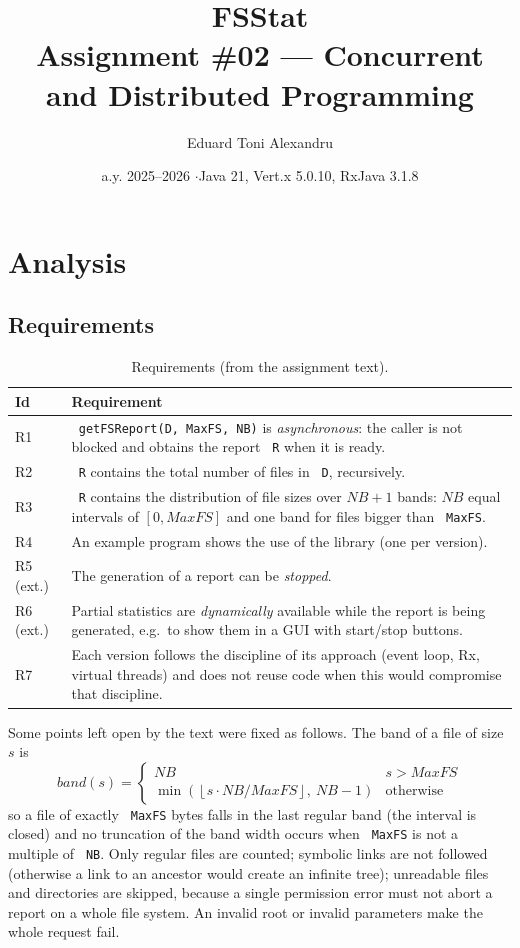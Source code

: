 \documentclass[11pt,a4paper]{article}
\title{\textbf{FSStat} \\[2pt] \large Assignment \#02 --- Concurrent and Distributed Programming}
\author{Eduard Toni Alexandru}
\date{a.y. 2025--2026 \quad$\cdot$\quad Java 21, Vert.x 5.0.10, RxJava 3.1.8}
\newcommand{\code}[1]{\texttt{\hyphenchar\font=-1 #1}}
\begin{document}
\maketitle

\section{Analysis}

\subsection{Requirements}

\begin{table}[h]
\centering\small
\begin{tabularx}{\textwidth}{@{}lY@{}}
\toprule
\textbf{Id} & \textbf{Requirement} \\
\midrule
R1 & \code{getFSReport(D, MaxFS, NB)} is \emph{asynchronous}: the caller is not blocked and obtains the
     report \code{R} when it is ready. \\
R2 & \code{R} contains the total number of files in \code{D}, recursively. \\
R3 & \code{R} contains the distribution of file sizes over $NB+1$ bands: $NB$ equal intervals of
     $[0, MaxFS]$ and one band for files bigger than \code{MaxFS}. \\
R4 & An example program shows the use of the library (one per version). \\
R5 (ext.) & The generation of a report can be \emph{stopped}. \\
R6 (ext.) & Partial statistics are \emph{dynamically} available while the report is being generated,
     e.g.\ to show them in a GUI with start/stop buttons. \\
R7 & Each version follows the discipline of its approach (event loop, Rx, virtual threads) and does not
     reuse code when this would compromise that discipline. \\
\bottomrule
\end{tabularx}
\caption{Requirements (from the assignment text).}\label{tab:req}
\end{table}

Some points left open by the text were fixed as follows. The band of a file of size $s$ is
\[
  band(s) = \begin{cases} NB & s > MaxFS\\ \min\left(\left\lfloor s\cdot NB / MaxFS \right\rfloor,\ NB-1\right) & \text{otherwise}\end{cases}
\]
so a file of exactly \code{MaxFS} bytes falls in the last regular band (the interval is closed) and no
truncation of the band width occurs when \code{MaxFS} is not a multiple of \code{NB}. Only regular files
are counted; symbolic links are not followed (otherwise a link to an ancestor would create an infinite
tree); unreadable files and directories are skipped, because a single permission error must not
abort a report on a whole file system. An invalid root or invalid parameters make the whole
request fail.
\end{document}
